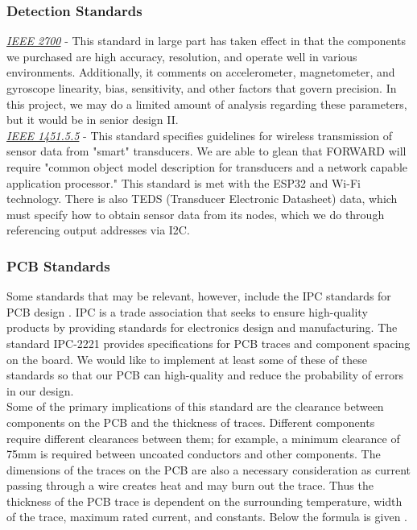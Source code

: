 \subsubsection{Detection Standards}
\noindent \underline{\textit{IEEE 2700}} - This standard in large part has taken effect in that the components we purchased are high accuracy, resolution, and operate well in various environments. Additionally, it comments on accelerometer, magnetometer, and gyroscope linearity, bias, sensitivity, and other factors that govern precision. In this project, we may do a limited amount of analysis regarding these parameters, but it would be in senior design II. \cite{sensor-standards-ieee}\\

\noindent \underline{\textit{IEEE 1451.5.5}} - This standard specifies guidelines for wireless transmission of sensor data from "smart" transducers. We are able to glean that FORWARD will require "common object model description for transducers and a network capable application processor." This standard is met with the ESP32 and Wi-Fi technology. There is also TEDS (Transducer Electronic Datasheet) data, which must specify how to obtain sensor data from its nodes, which we do through referencing output addresses via I2C. \cite{wireless-sensor-data-tx-ieee}\\

\subsubsection{PCB Standards}
\noindent Some standards that may be relevant, however, include the IPC standards for PCB design \cite{ipc2221}. IPC is a trade association that seeks to ensure high-quality products by providing standards for electronics design and manufacturing. The standard IPC-2221 provides specifications for PCB traces and component spacing on the board. We would like to implement at least some of these of these standards so that our PCB can high-quality and reduce the probability of errors in our design. \\ 

\noindent Some of the primary implications of this standard are the clearance between components on the PCB and the thickness of traces. Different components require different clearances between them; for example, a minimum clearance of 75mm is required between uncoated conductors and other components. The dimensions of the traces on the PCB are also a necessary consideration as current passing through a wire creates heat and may burn out the trace. Thus the thickness of the PCB trace is dependent on the surrounding temperature, width of the trace, maximum rated current, and constants. Below the formula is given \cite{ipc2221}. \\

